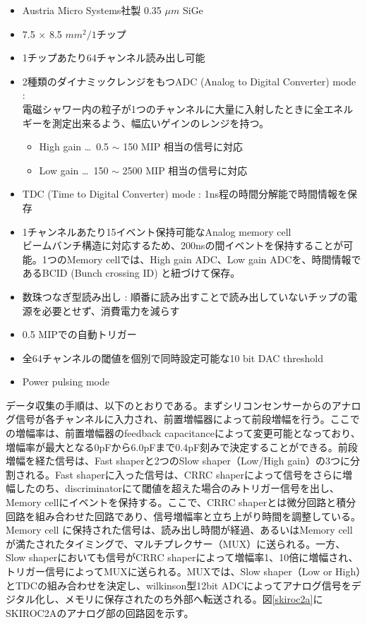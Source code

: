  \begin{itemize}
 	\item Austria Micro Systems社製 0.35 $\mu m$ SiGe
	\item 7.5 $\times$ 8.5 ${mm}^2 /1チップ$
	\item 1チップあたり64チャンネル読み出し可能
	\item 2種類のダイナミックレンジをもつADC (Analog to Digital Converter) mode :\\
		電磁シャワー内の粒子が1つのチャンネルに大量に入射したときに全エネルギーを測定出来るよう、幅広いゲインのレンジを持つ。
		\begin{itemize}
			\item High gain \ldots \ 0.5 $\sim$ 150 MIP 相当の信号に対応
			\item Low gain \ldots \ 150 $\sim$ 2500 MIP 相当の信号に対応
		\end{itemize}
	\item TDC (Time to Digital Converter) mode : 1ns程の時間分解能で時間情報を保存\\
	\item 1チャンネルあたり15イベント保持可能なAnalog memory cell\\
		ビームバンチ構造に対応するため、200nsの間イベントを保持することが可能。1つのMemory cellでは、High gain ADC、Low gain ADCを、時間情報であるBCID (Bunch crossing ID) と紐づけて保存。
	\item 数珠つなぎ型読み出し : 順番に読み出すことで読み出していないチップの電源を必要とせず、消費電力を減らす
	\item 0.5 MIPでの自動トリガー
	\item 全64チャンネルの閾値を個別で同時設定可能な10 bit DAC threshold
	\item Power pulsing mode
 \end{itemize}
データ収集の手順は、以下のとおりである。まずシリコンセンサーからのアナログ信号が各チャンネルに入力され、前置増幅器によって前段増幅を行う。ここでの増幅率は、前置増幅器のfeedback capacitanceによって変更可能となっており、増幅率が最大となる0pFから6.0pFまで0.4pF刻みで決定することができる。前段増幅を経た信号は、Fast shaperと2つのSlow shaper（Low/High gain）の3つに分割される。Fast shaperに入った信号は、CRRC shaperによって信号をさらに増幅したのち、discriminatorにて閾値を超えた場合のみトリガー信号を出し、Memory cellにイベントを保持する。ここで、CRRC shaperとは微分回路と積分回路を組み合わせた回路であり、信号増幅率と立ち上がり時間を調整している。Memory cell に保持された信号は、読み出し時間が経過、あるいはMemory cellが満たされたタイミングで、マルチプレクサー（MUX）に送られる。一方、Slow shaperにおいても信号がCRRC shaperによって増幅率1、10倍に増幅され、トリガー信号によってMUXに送られる。MUXでは、Slow shaper（Low or High）とTDCの組み合わせを決定し、wilkinson型12bit ADCによってアナログ信号をデジタル化し、メモリに保存されたのち外部へ転送される。図\ref{skiroc2a}にSKIROC2Aのアナログ部の回路図を示す。
